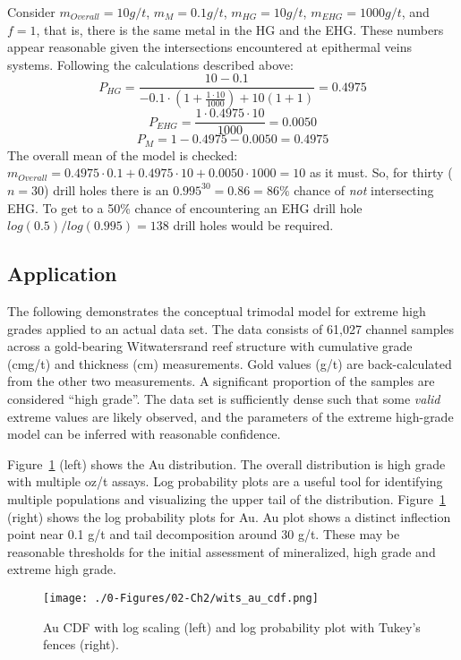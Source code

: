 Consider $m_{Overall} = 10 g/t$, $m_{M} = 0.1 g/t$, $m_{HG} = 10 g/t$, $m_{EHG} = 1000 g/t$, and $f=1$, that is, there is the same metal in the HG and the \gls{EHG}.  These numbers appear reasonable given the intersections encountered at epithermal veins systems. Following the calculations described above:
\[
    P_{HG} =
    \frac{10 - 0.1}
    {
        -0.1 \cdot \left( 1+\frac{1 \cdot 10}{1000}\right) + 10(1+1)
    }
    = 0.4975
\]
\[
    P_{EHG} = \frac{1 \cdot 0.4975 \cdot 10}{1000} = 0.0050
\]
\[
    P_{M} = 1 - 0.4975 - 0.0050 = 0.4975
\]
The overall mean of the model is checked: $m_{Overall} = 0.4975 \cdot 0.1 + 0.4975 \cdot 10 + 0.0050 \cdot 1000 = 10$ as it must. So, for thirty ($n=30$) drill holes there is an $0.995^{30}=0.86=86\%$ chance of {\em not} intersecting \gls{EHG}. To get to a 50\% chance of encountering an \gls{EHG} drill hole $log(0.5)/log(0.995)=138$ drill holes would be required.


\FloatBarrier
\subsection{Application}
\label{subsec:02application}

The following demonstrates the conceptual trimodal model for extreme high grades applied to an actual data set. The data consists of 61,027 channel samples across a gold-bearing Witwatersrand reef structure with cumulative grade (cmg/t) and thickness (cm) measurements. Gold values (g/t) are back-calculated from the other two measurements. A significant proportion of the samples are considered ``high grade''. The data set is sufficiently dense such that some \emph{valid} extreme values are likely observed, and the parameters of the extreme high-grade model can be inferred with reasonable confidence.

Figure~\ref{fig:wits_au_cdf} (left) shows the Au distribution. The overall distribution is high grade with multiple oz/t assays. Log probability plots are a useful tool for identifying multiple populations and visualizing the upper tail of the distribution. Figure~\ref{fig:wits_au_cdf} (right) shows the log probability plots for Au. Au plot shows a distinct inflection point near 0.1 g/t and tail decomposition around 30 g/t. These may be reasonable thresholds for the initial assessment of mineralized, high grade and extreme high grade.

\begin{figure}[htb!]
    \centering
    \texttt{[image: ./0-Figures/02-Ch2/wits\_au\_cdf.png]}
    \caption{Au \gls{CDF} with log scaling (left) and log probability plot with Tukey's fences \citep{tukey1977exploratory} (right).}
    \label{fig:wits_au_cdf}
\end{figure}

